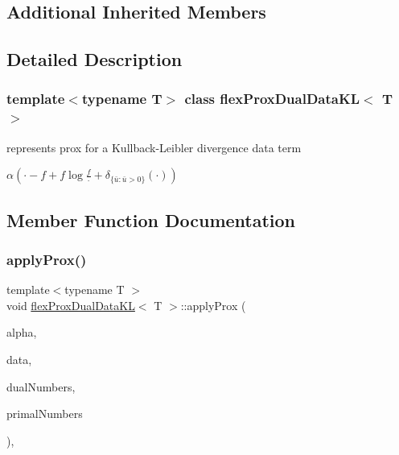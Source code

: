 \subsection*{Additional Inherited Members}


\subsection{Detailed Description}
\subsubsection*{template$<$typename T$>$\newline
class flex\+Prox\+Dual\+Data\+K\+L$<$ T $>$}

represents prox for a Kullback-\/\+Leibler divergence data term 

$ \alpha(\cdot-f+f\log\frac{f}{\cdot} + \delta_{\{\bar{u} : \bar{u}> 0 \}}(\cdot)) $ 

\subsection{Member Function Documentation}
\mbox{\label{classflex_prox_dual_data_k_l_ad6314cbdf307759e3176e26b3efba7c6}} 
\subsubsection{\texorpdfstring{apply\+Prox()}{applyProx()}\hspace{0.1cm}{\footnotesize\ttfamily [1/2]}}
{\footnotesize\ttfamily template$<$typename T $>$ \\
void \hyperlink{classflex_prox_dual_data_k_l}{flex\+Prox\+Dual\+Data\+KL}$<$ T $>$\+::apply\+Prox (\begin{DoxyParamCaption}\item[{T}]{alpha,  }\item[{\hyperlink{classflex_box_data}{flex\+Box\+Data}$<$ T $>$ $\ast$}]{data,  }\item[{const std\+::vector$<$ int $>$ \&}]{dual\+Numbers,  }\item[{const std\+::vector$<$ int $>$ \&}]{primal\+Numbers }\end{DoxyParamCaption})\hspace{0.3cm}{\ttfamily [inline]}, {\ttfamily [virtual]}}



